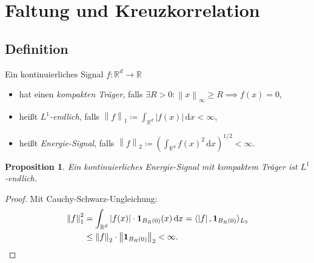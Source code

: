 \documentclass[envcountsect, smaller, aspectratio=149]{beamer}
\newtheorem{proposition}{Proposition}
\newcommand{\diff}{\,\textrm{d}}
\newcommand{\R}{\mathbb{R}}
\newcommand{\norm}[1]{\left\lVert#1\right\rVert}
\newcommand{\abs}[1]{\left\lvert#1\right\rvert}
\begin{document}
\section{Faltung und Kreuzkorrelation}
\subsection{Definition}
\begin{frame}[t]
    \begin{definition}
        Ein kontinuierliches Signal $f:\R^d \rightarrow \R$
        \begin{itemize}            
            \item hat einen \emph{kompakten Träger}, falls $\exists R > 0: \norm{x}_\infty \geq R \implies f(x) = 0$,
            \item heißt  \emph{$L^1$-endlich}, falls $\norm{f}_1 \coloneqq \int_{\R^d} \abs{f(x)} \diff x < \infty$,
            \item heißt \emph{Energie-Signal}, falls $\norm{f}_2 \coloneqq \left(\int_{\R^d} f(x)^2 \diff x \right)^{1/2} < \infty$.
        \end{itemize}
    \end{definition}
    \pause
    \begin{proposition}
        Ein kontinuierliches Energie-Signal mit kompaktem Träger ist $L^1$-endlich.
    \end{proposition}
    \pause
    \begin{proof}
        Mit Cauchy-Schwarz-Ungleichung:
        \vspace{-0.5em}
        \begin{align*}
            \norm{f}_1^2 
            &= \int_{\R^d} \abs{f(x)} \cdot \mathbf{1}_{B_R(0)}(x) \diff x
            = \langle \abs{f}, \mathbf{1}_{B_R(0)} \rangle_{L_2}\\
            &\leq \norm{f}_2 \cdot \norm{ \mathbf{1}_{B_R(0)}}_2 < \infty
            \qedhere.
        \end{align*}
        \vspace{-1em}
    \end{proof}
\end{frame}
\end{document}
